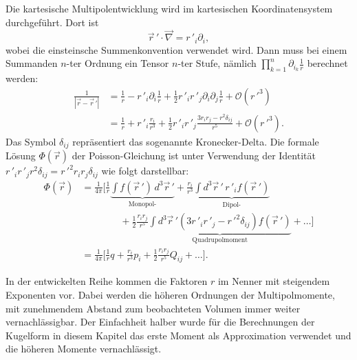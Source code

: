 Die kartesische Multipolentwicklung wird im kartesischen Koordinatensystem durchgeführt.
%
Dort ist
\begin{equation*}
\vec{r}\,' \cdot \vec{\nabla} = r\,'_{i} \partial_{i},
\end{equation*}
wobei die einsteinsche Summenkonvention verwendet wird.
%
%
Dann muss bei einem Summanden \(n\)-ter Ordnung ein Tensor \(n\)-ter Stufe, nämlich \(\textstyle \prod_{k=1}^{n} \partial_{i_{k}} \frac{1}{r}\) berechnet werden:
%
\begin{align*}
\frac{1}{|\vec{r} - \vec{r}\,'|}
&=
\frac{1}{r} - r\,'_{i} \partial_{i} \frac{1}{r} + \frac{1}{2} r\,'_{i} r\,'_{j} \partial_{i} \partial_{j} \frac{1}{r} + \mathcal{O}(r\,'^{3}) \\
&= \frac{1}{r} + r\,'_{i} \frac{r_{i}}{r^{3}} + \frac{1}{2} r\,'_{i} r\,'_{j} \frac{3 r_{i} r_{j} - r^{2} \delta_{i\!j}}{r^{5}} + \mathcal{O}(r\,'^{3}).
\end{align*}
Das Symbol \(\delta_{i\!j}\) repräsentiert das sogenannte Kronecker-Delta.
%
Die formale Lösung \(\Phi (\vec{r})\) der Poisson-Gleichung ist unter Verwendung der Identität \(r\,'_{i} r\,'_{j} r^{2} \delta_{i\!j} = r\,'^{2} r_{i} r_{j} \delta_{i\!j}\) wie folgt darstellbar:
\begin{align*}
\Phi (\vec{r})
&=
\frac{1}{4\pi}
\bigg[
\frac{1}{r}
\underbrace{\int f (\vec{r}\,') \, d^3 \vec{r}\,'}_{\text{Monopol-}}
+
\frac{r_{i}}{r^{3}}
\underbrace{\int d^3 \vec{r}\,' \, r\,'_{i} f (\vec{r}\,')}_{\text{Dipol-}}
\\
&\qquad\qquad
+
\frac{1}{2}
\frac{r_{i} r_{j}}{r^{5}}
\underbrace{\int d^3 \vec{r}\,' \left( 3 r\,'_{i} r\,'_{j} - r\,'^{2} \delta_{i\!j} \right) f (\vec{r}\,')}_{\text{Quadrupolmoment}}
+
\ldots
\bigg]
\\
&=
\frac{1}{4\pi}
\biggl[
\frac{1}{r} q
+
\frac{r_{i}}{r^{3}} p_{i}
+
\frac{1}{2} \frac{r_{i} r_{j}}{r^{5}} Q_{i\!j}
+
\ldots
\biggr].
\end{align*}

In der entwickelten Reihe kommen die Faktoren \(r\) im Nenner mit steigendem Exponenten vor.
Dabei werden die höheren Ordnungen der Multipolmomente, mit zunehmendem Abstand zum beobachteten Volumen immer weiter vernachlässigbar.
Der Einfachheit halber wurde für die Berechnungen der Kugelform in diesem Kapitel das erste Moment als Approximation verwendet und die höheren Momente vernachlässigt.

